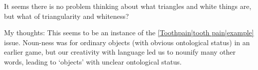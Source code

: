 It seems there is no problem thinking about what triangles and white things are, but what of triangularity and whiteness?

My thoughts: This seems to be an instance of the \ref{Toothpain|tooth pain|example} issue. Noun-ness was for ordinary objects (with obvious ontological status) in an earlier game, but our creativity with language led us to nounify many other words, leading to `objects' with unclear ontological status.